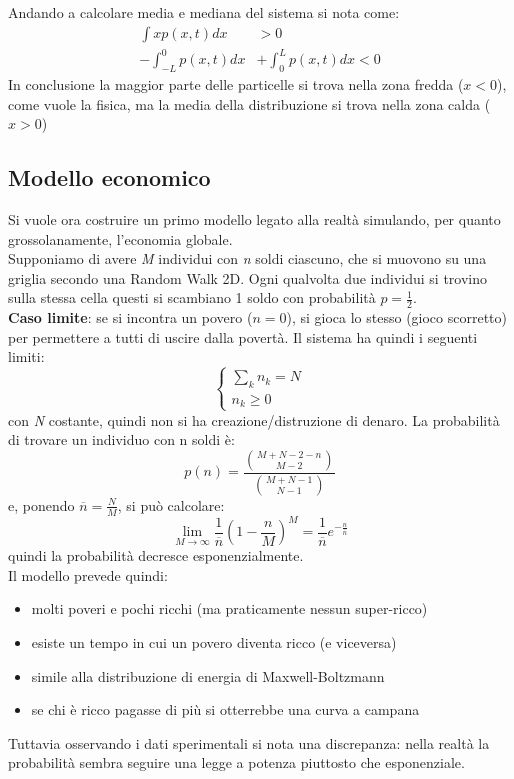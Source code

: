 \documentclass[12pt, a4paper]{book}
\theoremstyle{theorem}
\begin{document}
			Andando a calcolare media e mediana del sistema si nota come:
			\begin{equation}
				\begin{split}
					\int xp(x,t)dx&>0\\
					-\int_{-L}^0p(x,t)dx&+\int_0^Lp(x,t)dx<0
				\end{split}
			\end{equation}
			In conclusione la maggior parte delle particelle si trova nella zona fredda ($x<0$), come vuole la fisica, ma la media della distribuzione si trova nella zona calda ($x>0$)
			\subsection{Modello economico}
				Si vuole ora costruire un primo modello legato alla realtà simulando, per quanto grossolanamente, l'economia globale.\\
				Supponiamo di avere \textit{M} individui con \textit{n} soldi ciascuno, che si muovono su una griglia secondo una Random Walk 2D.
				Ogni qualvolta due individui si trovino sulla stessa cella questi si scambiano 1 soldo con probabilità $p=\frac{1}{2}$.\\
				\textbf{Caso limite}: se si incontra un povero ($n=0$), si gioca lo stesso (gioco scorretto) per permettere a tutti di uscire dalla povertà.
				Il sistema ha quindi i seguenti limiti:
				\begin{equation}
					\begin{cases}
						\sum_kn_k=N\\
						n_k\geq 0
					\end{cases}
				\end{equation}
				con \textit{N} costante, quindi non si ha creazione/distruzione di denaro.
				La probabilità di trovare un individuo con n soldi è:
				\begin{equation}
					p(n)=\frac{\binom{M+N-2-n}{M-2}}{\binom{M+N-1}{N-1}}
				\end{equation}
				e, ponendo $\overline{n}=\frac{N}{M}$, si può calcolare:
				\begin{equation}
					\lim_{M\to\infty}\frac{1}{\overline{n}}\left( 1-\frac{n}{M}\right)^M=\frac{1}{\overline{n}}e^{-\frac{n}{\bar{n}}}
				\end{equation}
				quindi la probabilità decresce esponenzialmente.\\
				Il modello prevede quindi:
				\begin{itemize}
					\item molti poveri e pochi ricchi (ma praticamente nessun super-ricco)
					\item esiste un tempo in cui un povero diventa ricco (e viceversa)
					\item simile alla distribuzione di energia di Maxwell-Boltzmann
					\item se chi è ricco pagasse di più si otterrebbe una curva a campana
				\end{itemize}
				Tuttavia osservando i dati sperimentali si nota una discrepanza: nella realtà la probabilità sembra seguire una legge a potenza piuttosto che esponenziale.
\end{document}
